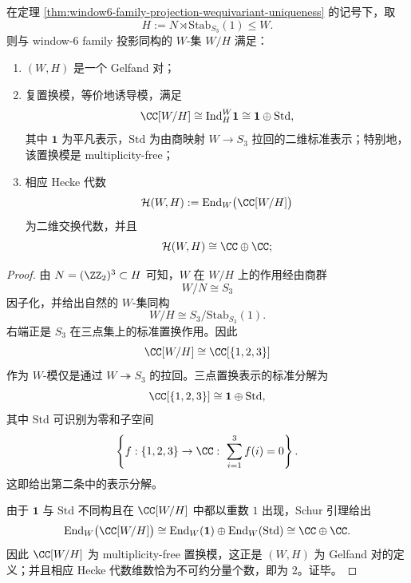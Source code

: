 \begin{theorem}\label{thm:window6-family-projection-spherical-hecke-two-modes}
在定理 \ref{thm:window6-family-projection-wequivariant-uniqueness} 的记号下，取
\[
H:=N\rtimes \mathrm{Stab}_{S_3}(1)\le W.
\]
则与 window-\(6\) family 投影同构的 \(W\)-集 \(W/H\) 满足：
\begin{enumerate}
  \item \((W,H)\) 是一个 Gelfand 对；
  \item 复置换模，等价地诱导模，满足
  \[
  \CC[W/H]\cong \mathrm{Ind}_H^W\mathbf 1\cong \mathbf 1\oplus \mathrm{Std},
  \]
  其中 \(\mathbf 1\) 为平凡表示，\(\mathrm{Std}\) 为由商映射 \(W\to S_3\) 拉回的二维标准表示；特别地，该置换模是 multiplicity-free；
  \item 相应 Hecke 代数
  \[
  \mathcal H(W,H):=\operatorname{End}_W\bigl(\CC[W/H]\bigr)
  \]
  为二维交换代数，并且
  \[
  \mathcal H(W,H)\cong \CC\oplus \CC;
  \]
\end{enumerate}
\end{theorem}
\begin{proof}
由 \(N=(\ZZ_2)^3\subset H\) 可知，\(W\) 在 \(W/H\) 上的作用经由商群
\[
W/N\cong S_3
\]
因子化，并给出自然的 \(W\)-集同构
\[
W/H\cong S_3/\mathrm{Stab}_{S_3}(1).
\]
右端正是 \(S_3\) 在三点集上的标准置换作用。因此
\[
\CC[W/H]\cong \CC[\{1,2,3\}]
\]
作为 \(W\)-模仅是通过 \(W\twoheadrightarrow S_3\) 的拉回。三点置换表示的标准分解为
\[
\CC[\{1,2,3\}]
\cong
\mathbf 1\oplus \mathrm{Std},
\]
其中 \(\mathrm{Std}\) 可识别为零和子空间
\[
\left\{f:\{1,2,3\}\to \CC:\ \sum_{i=1}^3 f(i)=0\right\}.
\]
这即给出第二条中的表示分解。

由于 \(\mathbf 1\) 与 \(\mathrm{Std}\) 不同构且在 \(\CC[W/H]\) 中都以重数 \(1\) 出现，Schur 引理给出
\[
\operatorname{End}_W\bigl(\CC[W/H]\bigr)
\cong
\operatorname{End}_W(\mathbf 1)\oplus \operatorname{End}_W(\mathrm{Std})
\cong
\CC\oplus \CC.
\]
因此 \(\CC[W/H]\) 为 multiplicity-free 置换模，这正是 \((W,H)\) 为 Gelfand 对的定义；并且相应 Hecke 代数维数恰为不可约分量个数，即为 \(2\)。证毕。
\end{proof}

